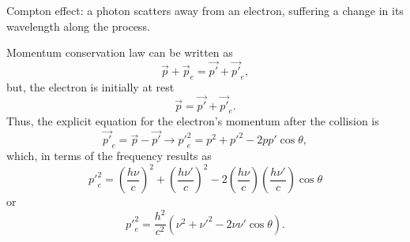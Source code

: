 \documentclass{article}
\begin{document}
\begin{marginfigure}
  \caption{Compton effect: a photon scatters away from an electron, suffering a change in its wavelength along the process.}
  \label{fig:compton}
\end{marginfigure}
Momentum conservation law can be written as
\begin{equation}\label{eq:momentumconserv}
  \vec{p}+\vec{p}_e=\vec{p'}+\vec{p'}_e,
\end{equation}
but, the electron is initially at rest
\begin{equation}\label{eq:momentumconserv1}
  \vec{p}=\vec{p'}+\vec{p'}_e.  
\end{equation}
Thus, the explicit equation for the electron's momentum after the collision is
\begin{equation}\label{eq:momentumconserv2}
  \vec{p'}_e=\vec{p}-\vec{p'}\rightarrow{p'}^2_e=p^2+{p'}^2-2pp'\cos\theta,
\end{equation}
which, in terms of the frequency results as
\begin{equation}\label{eq:momentumconserv3}
  {p'}^2_e=\left(\frac{h\nu}{c}\right)^2+\left(\frac{h\nu'}{c}\right)^2-2\left(\frac{h\nu}{c}\right)\left(\frac{h\nu'}{c}\right)\cos\theta
\end{equation}
or
\begin{equation}\label{eq:momentumconserv4}
  {p'}^2_e=\frac{h^2}{c^2}\left(\nu^2+\nu'^2-2\nu\nu'\cos\theta\right).
\end{equation}
\end{document}
